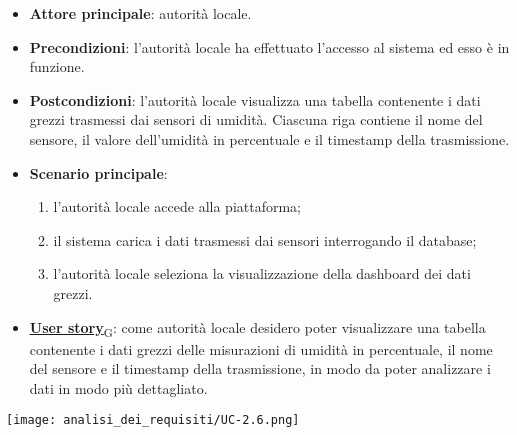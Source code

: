 \begin{itemize}
	\item \textbf{Attore principale}: autorità locale.
	\item \textbf{Precondizioni}: l'autorità locale ha effettuato l'accesso al sistema ed esso è in funzione.
	\item \textbf{Postcondizioni}: l'autorità locale visualizza una tabella contenente i dati grezzi trasmessi dai sensori di umidità.
	      Ciascuna riga contiene il nome del sensore, il valore dell'umidità in percentuale e il timestamp della trasmissione.
	\item \textbf{Scenario principale}:
	      \begin{enumerate}
		      \item l'autorità locale accede alla piattaforma;
		      \item il sistema carica i dati trasmessi dai sensori interrogando il database;
		      \item l'autorità locale seleziona la visualizzazione della dashboard dei dati grezzi.
	      \end{enumerate}
	\item \href{https://7last.github.io/docs/rtb/documentazione-interna/glossario\#user-story}{\textbf{User story}\textsubscript{G}}:
	      come autorità locale desidero poter visualizzare una tabella contenente i dati grezzi delle misurazioni di umidità in percentuale,
	      il nome del sensore e il timestamp della trasmissione, in modo da poter analizzare i dati in modo più dettagliato.
\end{itemize}
\begin{center}
	\texttt{[image: analisi\_dei\_requisiti/UC-2.6.png]}
\end{center}

